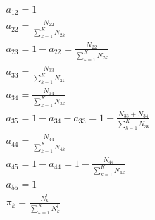 \documentclass[12pt,twoside]{article}
\begin{document}
\begin{enumerate}[(i)]
\begin{align}
a_{12} = 1 \\
a_{22} = \frac{N_{22}}{\sum_{k=1}^{K} N_{2k}} \\
a_{23} = 1-a_{22} = \frac{N_{22}}{\sum_{k=1}^{K} N_{2k}} \\
a_{33} =  \frac{N_{33}}{\sum_{k=1}^{K} N_{3k}} \\
a_{34} =  \frac{N_{34}}{\sum_{k=1}^{K} N_{3k}} \\
a_{35} = 1- a_{34} - a_{33} = 1- \frac{N_{33} + N_{34}}{\sum_{k=1}^{K} N_{3k}} \\
a_{44} =  \frac{N_{44}}{\sum_{k=1}^{K} N_{4k}} \\
a_{45} = 1- a_{44} = 1-  \frac{N_{44}}{\sum_{k=1}^{K} N_{4k}} \\
a_{55} = 1 \\
\pi_k = \frac{N_k^l}{\sum_{k=1}^{K} N_k^l} 
\end{align}



\end{enumerate}
\end{document}
